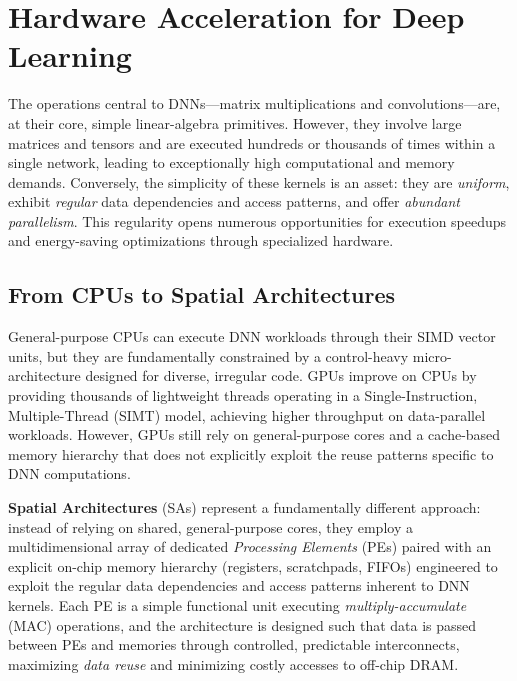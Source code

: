 \section{Hardware Acceleration for Deep Learning}
\label{sec:bg-hw-accel}

The operations central to DNNs---matrix multiplications and
convolutions---are, at their core, simple linear-algebra primitives.
However, they involve large matrices and tensors and are executed
hundreds or thousands of times within a single network, leading to
exceptionally high computational and memory demands.
Conversely, the simplicity of these kernels is an asset: they are
\emph{uniform}, exhibit \emph{regular} data dependencies and access
patterns, and offer \emph{abundant parallelism}.
This regularity opens numerous opportunities for execution speedups
and energy-saving optimizations through specialized hardware.


\subsection{From CPUs to Spatial Architectures}
\label{sec:cpu-gpu-sa}

General-purpose CPUs can execute DNN workloads through their SIMD
vector units, but they are fundamentally constrained by a control-heavy
micro-architecture designed for diverse, irregular code.
GPUs improve on CPUs by providing thousands of lightweight threads
operating in a Single-Instruction, Multiple-Thread (SIMT) model,
achieving higher throughput on data-parallel workloads.
However, GPUs still rely on general-purpose cores and a cache-based
memory hierarchy that does not explicitly exploit the reuse patterns
specific to DNN computations.

\textbf{Spatial Architectures} (SAs) represent a fundamentally different
approach: instead of relying on shared, general-purpose cores, they
employ a multidimensional array of dedicated \emph{Processing Elements}
(PEs) paired with an explicit on-chip memory hierarchy
(registers, scratchpads, FIFOs) engineered to exploit the regular
data dependencies and access patterns inherent to DNN kernels.
Each PE is a simple functional unit executing \emph{multiply-accumulate}
(MAC) operations, and the architecture is designed such that data is
passed between PEs and memories through controlled, predictable
interconnects, maximizing \emph{data reuse} and minimizing costly
accesses to off-chip DRAM.

